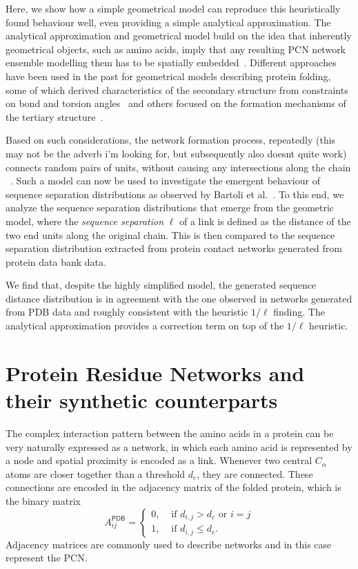\documentclass[
reprint,
twocolumn,
amsmath,amssymb,superscriptaddress,aps,
pre]{revtex4-1}
\newcommand{\red}[1]{\textcolor{red!80!black}{#1}}
\begin{document}
Here, we show how a simple geometrical model can reproduce this heuristically found behaviour well, even providing a simple analytical approximation. The analytical approximation and geometrical model build on the idea that inherently geometrical objects, such as amino acids, imply that any resulting PCN network ensemble modelling them has to be spatially embedded~\cite{molkenthin2016scaling, molkenthin2020self}. 
Different approaches have been used in the past for geometrical models describing protein folding, some of which derived characteristics of the secondary structure from constraints on bond and torsion angles~\cite{maybe cite Flory stuff here as well?,Danielsson2010,Molkenthin2011} and others focused on the formation mechanisms of the tertiary structure~\cite{molkenthin2016scaling, molkenthin2020self}. 

Based on such considerations, the network formation process, repeatedly \red{(this may not be the adverb i'm looking for, but subsequently also doesnt quite work)} connects random pairs of units, without causing any intersections along the chain ~\cite{molkenthin2016scaling}. Such a model can now be used to investigate the emergent behaviour of sequence separation distributions as observed by Bartoli et al.~\cite{bartoli2008effect}. To this end, we analyze the sequence separation distributions that emerge from the geometric model, where the \emph{sequence separation} $\ell$ of a link is defined as the distance of the two end units along the original chain.
This is then compared to the sequence separation distribution extracted from protein contact networks generated from protein data bank data. 

\red{We find that, despite the highly simplified model, the generated sequence distance distribution is in agreement with the one observed in networks generated from PDB data and roughly consistent with the heuristic $1/\ell$ finding. The analytical approximation provides a correction term on top of the $1/\ell$ heuristic.}


\section*{Protein Residue Networks and their synthetic counterparts}
The complex interaction pattern between the amino acids in a protein can be very naturally expressed as a network, in which each amino acid is represented by a node and spatial proximity is encoded as a link. Whenever two central $C_\alpha$ atoms are closer together than a threshold $d_c$, they are connected. These connections are encoded in the adjacency matrix of the folded protein, which is the binary matrix
\begin{equation}
  A^{\textsf{PDB}}_{ij}=
  \begin{cases}
   0, & \text{ if } d_{i,j}>d_c \text{ or } i=j\\
      1, & \text{ if } d_{i,j}\leq d_c .
      \end{cases}
    \label{eq:aij}
\end{equation}
Adjacency matrices are commonly used to describe networks and in this case represent the PCN.
\end{document}
